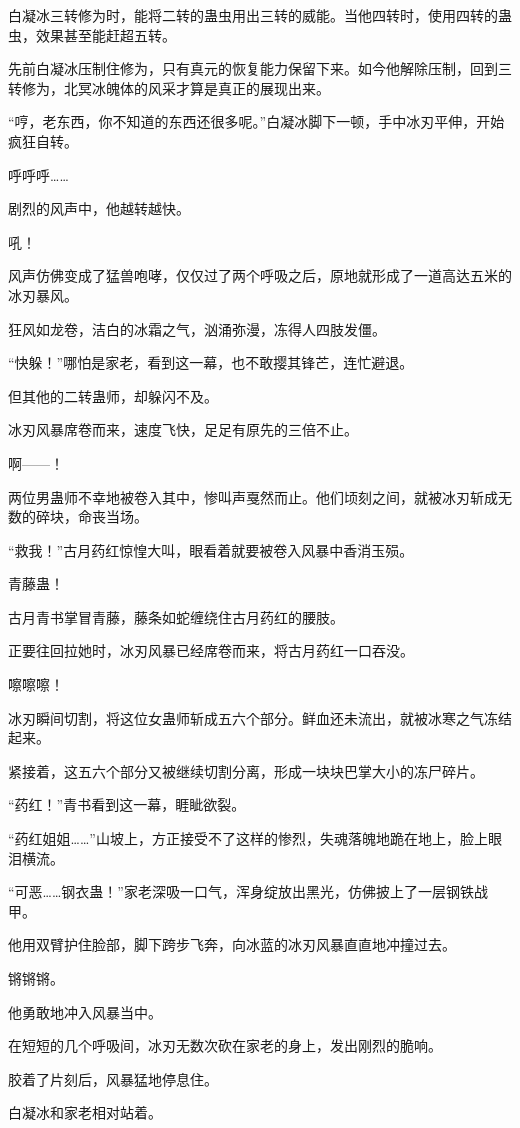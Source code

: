 \begin{this_body}
白凝冰三转修为时，能将二转的蛊虫用出三转的威能。当他四转时，使用四转的蛊虫，效果甚至能赶超五转。

先前白凝冰压制住修为，只有真元的恢复能力保留下来。如今他解除压制，回到三转修为，北冥冰魄体的风采才算是真正的展现出来。

“哼，老东西，你不知道的东西还很多呢。”白凝冰脚下一顿，手中冰刃平伸，开始疯狂自转。

呼呼呼……

剧烈的风声中，他越转越快。

吼！

风声仿佛变成了猛兽咆哮，仅仅过了两个呼吸之后，原地就形成了一道高达五米的冰刃暴风。

狂风如龙卷，洁白的冰霜之气，汹涌弥漫，冻得人四肢发僵。

“快躲！”哪怕是家老，看到这一幕，也不敢撄其锋芒，连忙避退。

但其他的二转蛊师，却躲闪不及。

冰刃风暴席卷而来，速度飞快，足足有原先的三倍不止。

啊——！

两位男蛊师不幸地被卷入其中，惨叫声戛然而止。他们顷刻之间，就被冰刃斩成无数的碎块，命丧当场。

“救我！”古月药红惊惶大叫，眼看着就要被卷入风暴中香消玉殒。

青藤蛊！

古月青书掌冒青藤，藤条如蛇缠绕住古月药红的腰肢。

正要往回拉她时，冰刃风暴已经席卷而来，将古月药红一口吞没。

嚓嚓嚓！

冰刃瞬间切割，将这位女蛊师斩成五六个部分。鲜血还未流出，就被冰寒之气冻结起来。

紧接着，这五六个部分又被继续切割分离，形成一块块巴掌大小的冻尸碎片。

“药红！”青书看到这一幕，睚眦欲裂。

“药红姐姐……”山坡上，方正接受不了这样的惨烈，失魂落魄地跪在地上，脸上眼泪横流。

“可恶……钢衣蛊！”家老深吸一口气，浑身绽放出黑光，仿佛披上了一层钢铁战甲。

他用双臂护住脸部，脚下跨步飞奔，向冰蓝的冰刃风暴直直地冲撞过去。

锵锵锵。

他勇敢地冲入风暴当中。

在短短的几个呼吸间，冰刃无数次砍在家老的身上，发出刚烈的脆响。

胶着了片刻后，风暴猛地停息住。

白凝冰和家老相对站着。


\end{this_body}
